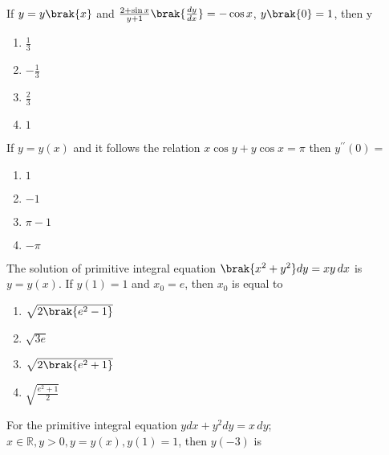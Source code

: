\item If $y = y\brak{x}$ and $\frac{2 + \sin x}{y + 1}\brak{\frac{dy}{dx}} = -\cos x$, $y\brak{0} = 1$, then y \hfill {}

\begin{multicols}{2}
\begin{enumerate}
    \item $\frac{1}{3}$
    \item $-\frac{1}{3}$
    \item $\frac{2}{3}$
    \item $1$
\end{enumerate}
\end{multicols}

\item If $y = y(x)$ and it follows the relation $x \cos y + y \cos x = \pi$ then $y^{\prime\prime}(0) =$ \hfill {}

\begin{multicols}{2}
\begin{enumerate}
    \item $1$
    \item $-1$
    \item $\pi - 1$
    \item $-\pi$
\end{enumerate}  
\end{multicols}

\item The solution of primitive integral equation $\brak{x^2 + y^2}dy = xy \, dx$ is $y = y(x)$. If $y(1) = 1$ and $x_0 = e$, then $x_0$ is equal to \hfill {}

\begin{multicols}{2}
\begin{enumerate}
    \item $\sqrt{2\brak{e^2 - 1}}$
    \item $\sqrt{3e}$ 
    \item $\sqrt{2\brak{e^2 + 1}}$
    \item $\sqrt{\frac{e^2 + 1}{2}}$
\end{enumerate}
\end{multicols}

\item For the primitive integral equation $y dx + y^2 dy = x \, dy$; $x \in \mathbb{R}, y > 0, y = y(x), y(1) = 1$, then $y(-3)$ is \hfill {}

